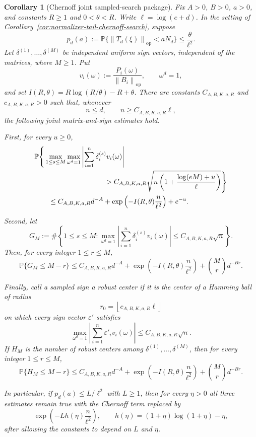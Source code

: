 \documentclass[11pt]{amsart}
\numberwithin{equation}{section}
\newtheorem{corollary}[theorem]{Corollary}
\theoremstyle{definition}
\theoremstyle{remark}
\newcommand{\op}{\mathrm{op}}
\newcommand{\Prob}{\mathbb P}
\newcommand{\norm}[1]{\left\lVert #1\right\rVert}
\newcommand{\eps}{\varepsilon}
\begin{document}
\begin{corollary}[Chernoff joint sampled-search package]
\label{cor:normalizer-tail-chernoff-joint-search}
Fix \(A>0\), \(B>0\), \(a>0\), and constants \(R\ge1\) and \(0<\theta<R\).
Write \(\ell=\log(e+d)\).  In the setting of
Corollary~\ref{cor:normalizer-tail-chernoff-search}, suppose
\[
  p_d(a):=\Prob\{\norm{T_d(\xi)}_{\op}<aN_d\}\le \frac{\theta}{\ell^2}.
\]
Let \(\delta^{(1)},\ldots,\delta^{(M)}\) be independent uniform sign vectors,
independent of the matrices, where \(M\ge1\).  Put
\[
  v_i(\omega):=\frac{P_i(\omega)}{\norm{B_i}_{\op}},
  \qquad \omega^d=1,
\]
and set \(I(R,\theta)=R\log(R/\theta)-R+\theta\).  There are constants
\(C_{A,B,K,a,R}\) and \(c_{A,B,K,a,R}>0\) such that, whenever
\[
  n\le d,\qquad n\ge C_{A,B,K,a,R}\ell ,
\]
the following joint matrix-and-sign estimates hold.

First, for every \(u\ge0\),
\[
\begin{aligned}
&\Prob\Bigg\{
  \max_{1\le s\le M}\max_{\omega^d=1}
  \left|\sum_{i=1}^n\delta_i^{(s)}v_i(\omega)\right|
\\
&\hspace{35mm}>
  C_{A,B,K,a,R}\sqrt{
    n\left(1+\frac{\log(eM)+u}{\ell}\right)}
  \Bigg\}
\\
&\qquad\le
  C_{A,B,K,a,R}d^{-A}
  +\exp\left(-I(R,\theta)\frac n{\ell^2}\right)
  +e^{-u}.
\end{aligned}
\]

Second, let
\[
  G_M:=\#\left\{1\le s\le M:
  \max_{\omega^d=1}\left|\sum_{i=1}^n
  \delta_i^{(s)}v_i(\omega)\right|
  \le C_{A,B,K,a,R}\sqrt n\right\}.
\]
Then, for every integer \(1\le r\le M\),
\[
  \Prob\{G_M\le M-r\}
  \le
  C_{A,B,K,a,R}d^{-A}
  +\exp\left(-I(R,\theta)\frac n{\ell^2}\right)
  +\binom Mr d^{-Br}.
\]

Finally, call a sampled sign a robust center if it is the center of a Hamming
ball of radius
\[
  r_0=\left\lfloor c_{A,B,K,a,R}\ell\right\rfloor
\]
on which every sign vector \(\eps'\) satisfies
\[
  \max_{\omega^d=1}\left|\sum_{i=1}^n
  \eps'_i v_i(\omega)\right|
  \le C_{A,B,K,a,R}\sqrt n .
\]
If \(H_M\) is the number of robust centers among
\(\delta^{(1)},\ldots,\delta^{(M)}\), then for every integer \(1\le r\le M\),
\[
  \Prob\{H_M\le M-r\}
  \le
  C_{A,B,K,a,R}d^{-A}
  +\exp\left(-I(R,\theta)\frac n{\ell^2}\right)
  +\binom Mr d^{-Br}.
\]

In particular, if \(p_d(a)\le L/\ell^2\) with \(L\ge1\), then for every
\(\eta>0\) all three estimates remain true with the Chernoff term replaced by
\[
  \exp\left(-Lh(\eta)\frac n{\ell^2}\right),
  \qquad h(\eta)=(1+\eta)\log(1+\eta)-\eta ,
\]
after allowing the constants to depend on \(L\) and \(\eta\).
\end{corollary}
\end{document}
